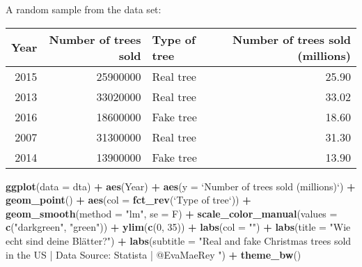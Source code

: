 \documentclass[]{book}
\newenvironment{Shaded}{\begin{snugshade}}{\end{snugshade}}
\newcommand{\KeywordTok}[1]{\textcolor[rgb]{0.13,0.29,0.53}{\textbf{#1}}}
\newcommand{\DataTypeTok}[1]{\textcolor[rgb]{0.13,0.29,0.53}{#1}}
\newcommand{\DecValTok}[1]{\textcolor[rgb]{0.00,0.00,0.81}{#1}}
\newcommand{\StringTok}[1]{\textcolor[rgb]{0.31,0.60,0.02}{#1}}
\newcommand{\OperatorTok}[1]{\textcolor[rgb]{0.81,0.36,0.00}{\textbf{#1}}}
\newcommand{\NormalTok}[1]{#1}
\theoremstyle{definition}
\theoremstyle{definition}
\theoremstyle{definition}
\theoremstyle{remark}
\begin{document}
A random sample from the data set:

\begin{tabular}{r|r|l|r}
\hline
Year & Number of trees sold & Type of tree & Number of trees sold (millions)\\
\hline
2015 & 25900000 & Real tree & 25.90\\
\hline
2013 & 33020000 & Real tree & 33.02\\
\hline
2016 & 18600000 & Fake tree & 18.60\\
\hline
2007 & 31300000 & Real tree & 31.30\\
\hline
2014 & 13900000 & Fake tree & 13.90\\
\hline
\end{tabular}

\begin{Shaded}
\begin{Highlighting}[]
\KeywordTok{ggplot}\NormalTok{(}\DataTypeTok{data =}\NormalTok{ dta) }\OperatorTok{+}
\StringTok{  }\KeywordTok{aes}\NormalTok{(Year) }\OperatorTok{+}
\StringTok{  }\KeywordTok{aes}\NormalTok{(}\DataTypeTok{y =} \StringTok{`}\DataTypeTok{Number of trees sold (millions)}\StringTok{`}\NormalTok{) }\OperatorTok{+}
\StringTok{  }\KeywordTok{geom_point}\NormalTok{() }\OperatorTok{+}
\StringTok{  }\KeywordTok{aes}\NormalTok{(}\DataTypeTok{col =} \KeywordTok{fct_rev}\NormalTok{(}\StringTok{`}\DataTypeTok{Type of tree}\StringTok{`}\NormalTok{)) }\OperatorTok{+}
\StringTok{  }\KeywordTok{geom_smooth}\NormalTok{(}\DataTypeTok{method =} \StringTok{"lm"}\NormalTok{, }\DataTypeTok{se =}\NormalTok{ F) }\OperatorTok{+}
\StringTok{  }\KeywordTok{scale_color_manual}\NormalTok{(}\DataTypeTok{values =} \KeywordTok{c}\NormalTok{(}\StringTok{"darkgreen"}\NormalTok{, }\StringTok{"green"}\NormalTok{)) }\OperatorTok{+}
\StringTok{  }\KeywordTok{ylim}\NormalTok{(}\KeywordTok{c}\NormalTok{(}\DecValTok{0}\NormalTok{, }\DecValTok{35}\NormalTok{)) }\OperatorTok{+}
\StringTok{  }\KeywordTok{labs}\NormalTok{(}\DataTypeTok{col =} \StringTok{""}\NormalTok{) }\OperatorTok{+}
\StringTok{  }\KeywordTok{labs}\NormalTok{(}\DataTypeTok{title =} \StringTok{"Wie echt sind deine Blätter?"}\NormalTok{) }\OperatorTok{+}
\StringTok{  }\KeywordTok{labs}\NormalTok{(}\DataTypeTok{subtitle =} \StringTok{"Real and fake Christmas trees sold in the US | Data Source: Statista | @EvaMaeRey "}\NormalTok{) }\OperatorTok{+}
\StringTok{  }\KeywordTok{theme_bw}\NormalTok{() }
\end{Highlighting}
\end{Shaded}
\end{document}
